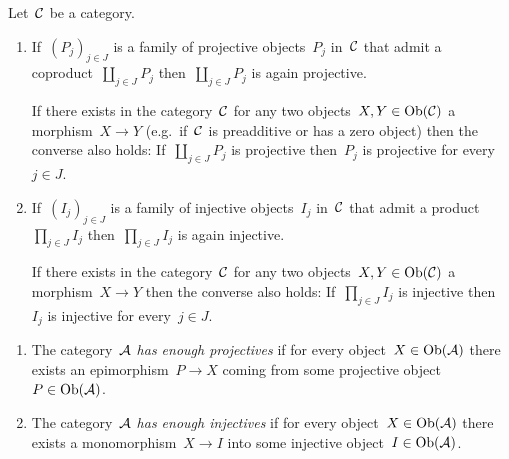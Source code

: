 \begin{remark*}
  Let~$\mathcal{C}$ be a category.
  \begin{enumerate}
    \item
      If~$(P_j)_{j \in J}$ is a family of projective objects~$P_j$ in~$\mathcal{C}$ that admit a coproduct~$\coprod_{j \in J} P_j$ then~$\coprod_{j \in J} P_j$ is again projective.
      
      If there exists in the category~$\mathcal{C}$ for any two objects~$X, Y \in \operatorname{Ob}(\mathcal{C})$ a morphism~$X \to Y$ (e.g.\ if~$\mathcal{C}$ is preadditive or has a zero object) then the converse also holds:
      If~$\coprod_{j \in J} P_j$ is projective then~$P_j$ is projective for every~$j \in J$.
    \item
      If~$(I_j)_{j \in J}$ is a family of injective objects~$I_j$ in~$\mathcal{C}$ that admit a product~$\prod_{j \in J} I_j$ then~$\prod_{j \in J} I_j$ is again injective.
      
      If there exists in the category~$\mathcal{C}$ for any two objects~$X, Y \in \operatorname{Ob}(\mathcal{C})$ a morphism~$X \to Y$ then the converse also holds:
      If~$\prod_{j \in J} I_j$ is injective then~$I_j$ is injective for every~$j \in J$.
  \end{enumerate}
\end{remark*}


\begin{definition}
  \leavevmode
  \begin{enumerate}
    \item 
      The category~$\mathcal{A}$ \emph{has enough projectives} if for every object~$X \in \operatorname{Ob}(\mathcal{A})$ there exists an epimorphism~$P \to X$ coming from some projective object~$P \in \operatorname{Ob}(\mathcal{A})$.
    \item
      The category~$\mathcal{A}$ \emph{has enough injectives} if for every object~$X \in \operatorname{Ob}(\mathcal{A})$ there exists a monomorphism~$X \to I$ into some injective object~$I \in \operatorname{Ob}(\mathcal{A})$.
  \end{enumerate}
\end{definition}


